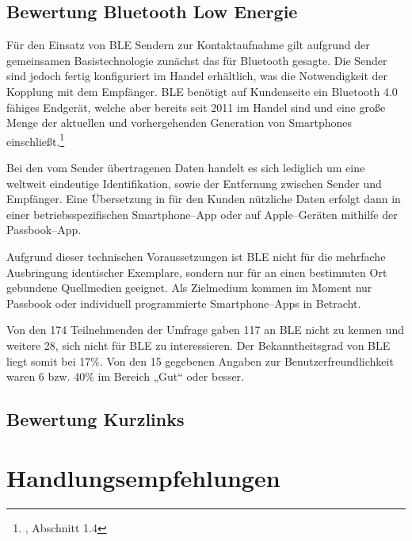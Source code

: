 
\subsection{Bewertung Bluetooth Low Energie} %
\label{sub:bewertung_bluetooth_low_energie}
Für den Einsatz von \ac{BLE} Sendern zur Kontaktaufnahme gilt aufgrund der gemeinsamen Basistechnologie zunächst das für Bluetooth gesagte. Die Sender sind jedoch fertig konfiguriert im Handel erhältlich, was die Notwendigkeit der Kopplung mit dem Empfänger. \ac{BLE} benötigt auf Kundenseite ein Bluetooth 4.0 fähiges Endgerät, welche aber bereits seit 2011 im Handel sind und eine große Menge der aktuellen und vorhergehenden Generation von Smartphones einschließt.\footnote{\cite{gilchrist}, Abschnitt 1.4}

Bei den vom Sender übertragenen Daten handelt es sich lediglich um eine weltweit eindeutige Identifikation, sowie der Entfernung zwischen Sender und Empfänger. Eine Übersetzung in für den Kunden nützliche Daten erfolgt dann in einer betriebsspezifischen Smartphone–App oder auf Apple–Geräten mithilfe der Passbook–App.

Aufgrund dieser technischen Voraussetzungen ist \ac{BLE} nicht für die mehrfache Ausbringung identischer Exemplare, sondern nur für an einen bestimmten Ort gebundene Quellmedien geeignet. Als Zielmedium kommen im Moment nur Passbook oder individuell programmierte Smartphone–Apps in Betracht.

Von den 174 Teilnehmenden der Umfrage gaben 117 an \ac{BLE} nicht zu kennen und weitere 28, sich nicht für \ac{BLE} zu interessieren. Der Bekanntheitsgrad von \ac{BLE} liegt somit bei 17\%. Von den 15 gegebenen Angaben zur Benutzerfreundlichkeit waren 6 bzw. 40\% im Bereich „Gut“ oder besser.



\subsection{Bewertung Kurzlinks} %
\label{sub:bewertung_kurzlinks}



\newpage
\section{Handlungsempfehlungen} %
\label{sec:handlungsempfehlungen}

